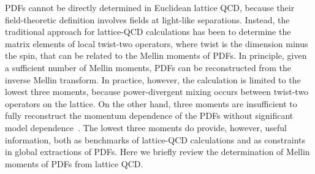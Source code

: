 PDFs cannot be directly determined in Euclidean lattice QCD, because their 
field-theoretic definition involves fields at light-like separations.
%
Instead, 
the traditional approach for lattice-QCD calculations has been to determine the matrix elements of local twist-two operators, where twist is the dimension minus the spin, that can be related to the Mellin moments of PDFs.
%
In principle, given a sufficient number of Mellin moments, PDFs can be reconstructed from the inverse Mellin transform. In practice, however, the calculation is limited to the lowest three moments, because power-divergent mixing occurs between twist-two operators on the lattice.
%
On the other hand,
three moments are insufficient to fully reconstruct the momentum dependence of the PDFs without significant model dependence~\cite{Detmold:2003rq}.
%
The lowest three moments do provide, however, useful information, both as benchmarks of lattice-QCD calculations and as constraints in global extractions of PDFs. Here we briefly review the determination of Mellin moments of PDFs from lattice QCD. 

